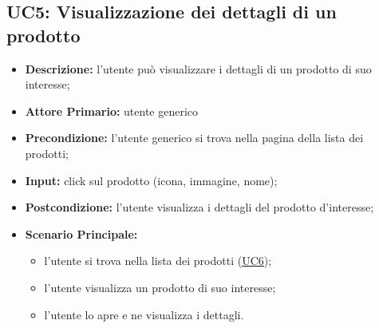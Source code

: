 \subsection{UC5: Visualizzazione dei dettagli di un prodotto}
        \label{sec:UC5}
        \begin{itemize}
            \item \textbf{Descrizione:} l'utente può visualizzare i dettagli di un prodotto di suo interesse;
            \item \textbf{Attore Primario:} utente generico
            \item \textbf{Precondizione:} l'utente generico si trova nella pagina della lista dei prodotti;
            \item \textbf{Input:} click sul prodotto (icona, immagine, nome);
            \item \textbf{Postcondizione:} l'utente visualizza i dettagli del prodotto d'interesse;
            \item \textbf{Scenario Principale:} 
                \begin{itemize}
                    \item l'utente si trova nella lista dei prodotti (\hyperref[sec:UC6]{\underline{UC6}});
                    \item l'utente visualizza un prodotto di suo interesse;
                    \item l'utente lo apre e ne visualizza i dettagli.
                \end{itemize}
        \end{itemize}